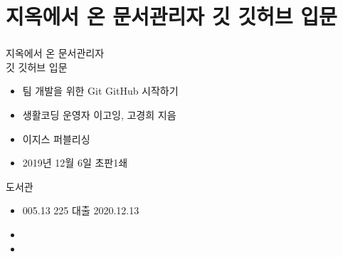 \documentclass[aspectratio=1610,17pt,xcolor=pdftex,dvipsnames,table,handout]{beamer}
\begin{document}
		\section{지옥에서 온 문서관리자 깃 깃허브 입문}
		\begin{frame} [t,plain]
		\frametitle{}
			\begin{block}  {지옥에서 온 문서관리자 \\깃 깃허브 입문}
			\setlength{\leftmargini}{4em}			
			\begin{itemize}
				\item [제목]  	팀 개발을 위한 Git GitHub 시작하기
				\item [지은이]	생활코딩 운영자 이고잉, 고경희 지음
				\item [출판사]	이지스 퍼블리싱 
				\item [출판일]	2019년 12월 6일 초판1쇄
			\end{itemize}
			\end{block}						

			\begin{block}  {도서관}
			\setlength{\leftmargini}{4em}			
			\begin{itemize}
				\item [중앙]		005.13 225   대출 2020.12.13 
				\item [수정]		
				\item [도서관]
			\end{itemize}
			\end{block}						
								
		\end{frame}						
		
\end{document}
